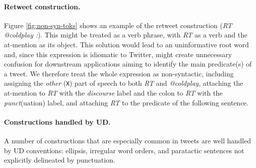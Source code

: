 \documentclass[11pt,a4paper]{article}
\newcommand{\nascomment}[1]{\textcolor{blue}{[#1 ---\textsc{nas}]}}
\begin{document}

\paragraph{Retweet construction.} Figure \ref{fig:non-syn-toks} shows
an example of the retweet construction (\emph{RT @coldplay :}).  This
might be treated as a verb phrase, with \emph{RT} as a verb and the
at-mention as its object.  This solution would lead to an uninformative root
word and, since this expression is idiomatic to Twitter, might create
unnecessary confusion for downstream applications aiming to identify
the main predicate(s) of a tweet.  We therefore treat the whole
expression as non-syntactic, including assigning the \emph{other}
(\texttt{X}) part of speech to both \emph{RT} and \emph{@coldplay},
attaching the at-mention to \emph{RT} with the \emph{discourse}
label and the colon to \emph{RT} with the \emph{punct}(uation) label,
and attaching \emph{RT} to the predicate of the following sentence. 



\paragraph{Constructions handled by UD.}  A number of constructions
that are especially common in tweets are well handled by UD
conventions:  ellipsis, irregular word orders, and paratactic sentences
not explicitly delineated by punctuation.
	
\end{document}
